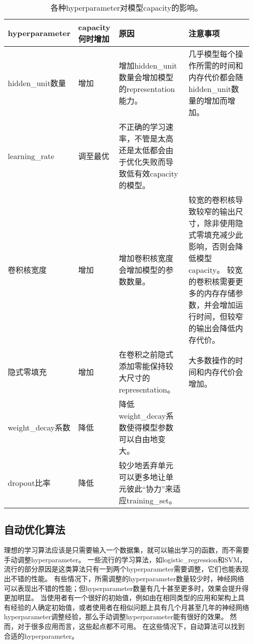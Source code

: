 \begin{table}
\centering
\small
\begin{tabular}{p{2.5cm}|p{1.5cm}|p{4.0cm}|p{4.0cm}}
\gls{hyperparameter} & \gls{capacity}何时增加 & 原因  & 注意事项 \\
\hline
\gls{hidden_unit}数量 &  增加          & 增加\gls{hidden_unit}数量会增加模型的\gls{representation}能力。 & 几乎模型每个操作所需的时间和内存代价都会随\gls{hidden_unit}数量的增加而增加。\\
\hline
\gls{learning_rate} & 调至最优 & 不正确的学习速率，不管是太高还是太低都会由于优化失败而导致低有效\gls{capacity}的模型。
 & \\
\hline
卷积核宽度 & 增加 & 增加卷积核宽度会增加模型的参数数量。&
较宽的卷积核导致较窄的输出尺寸，除非使用隐式零填充减少此影响，否则会降低模型\gls{capacity}。 
较宽的卷积核需要更多的内存存储参数，并会增加运行时间，但较窄的输出会降低内存代价。
\\
\hline
隐式零填充 & 增加 & 在卷积之前隐式添加零能保持较大尺寸的\gls{representation}。&
大多数操作的时间和内存代价会增加。\\
\hline
\gls{weight_decay}系数 & 降低 & 降低\gls{weight_decay}系数使得模型参数可以自由地变大。
 & \\
\hline
\gls{dropout}比率 & 降低 & 较少地丢弃单元可以更多地让单元彼此``协力''来适应\gls{training_set}。
 & \\
\end{tabular}
\caption{各种\gls{hyperparameter}对模型\gls{capacity}的影响。}
\label{tab:hyperparameter_effect}
\end{table}




\subsection{自动优化算法}
\label{sec:automatic_hyperparameter_optimization_algorithms}
理想的学习算法应该是只需要输入一个数据集，就可以输出学习的函数，而不需要手动调整\gls{hyperparameter}。
一些流行的学习算法，如\gls{logistic_regression}和\gls{SVM}，流行的部分原因是这类算法只有一到两个\gls{hyperparameter}需要调整，它们也能表现出不错的性能。
有些情况下，所需调整的\gls{hyperparameter}数量较少时，神经网络可以表现出不错的性能；但\gls{hyperparameter}数量有几十甚至更多时，效果会提升得更加明显。
当使用者有一个很好的初始值，例如由在相同类型的应用和架构上具有经验的人确定初始值，或者使用者在相似问题上具有几个月甚至几年的神经网络\gls{hyperparameter}调整经验，那么手动调整\gls{hyperparameter}能有很好的效果。%
然而，对于很多应用而言，这些起点都不可用。
在这些情况下，自动算法可以找到合适的\gls{hyperparameter}。


